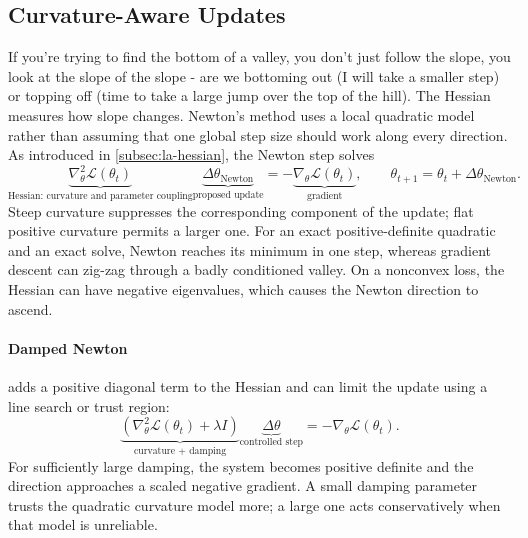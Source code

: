 \subsection{Curvature-Aware Updates}
\label{sec:optimisation-newton-s-method-and-other-second-order-methods}
If you're trying to find the bottom of a valley, you don't just follow the slope, you look at the slope of the slope - are we bottoming out (I will take a smaller step) or topping off (time to take a large jump over the top of the hill).
The Hessian measures how slope changes.
Newton's method uses a local quadratic model rather than assuming that one global step size should work along every direction.
As introduced in \cref{subsec:la-hessian}, the Newton step solves
\[
    \underbrace{\nabla_\theta^2\mathcal L(\theta_t)}_{\text{Hessian: curvature and parameter coupling}}
    \underbrace{\Delta\theta_{\text{Newton}}}_{\text{proposed update}}
    =-
    \underbrace{\nabla_\theta\mathcal L(\theta_t)}_{\text{gradient}}
    ,\qquad
    \theta_{t+1}=\theta_t+\Delta\theta_{\text{Newton}}.
\]
Steep curvature suppresses the corresponding component of the update; flat positive curvature permits a larger one.
For an exact positive-definite quadratic and an exact solve, Newton reaches its minimum in one step, whereas gradient descent can zig-zag through a badly conditioned valley.
On a nonconvex loss, the Hessian can have negative eigenvalues, which causes the Newton direction to ascend.

\paragraph{Damped Newton} adds a positive diagonal term to the Hessian and can limit the update using a line search or trust region:
\[
    \underbrace{(\nabla_\theta^2\mathcal L(\theta_t)+\lambda I)}_{\text{curvature + damping}}
    \underbrace{\Delta\theta}_{\text{controlled step}}
    =-\nabla_\theta\mathcal L(\theta_t).
\]
For sufficiently large damping, the system becomes positive definite and the direction approaches a scaled negative gradient.
A small damping parameter trusts the quadratic curvature model more; a large one acts conservatively when that model is unreliable.


